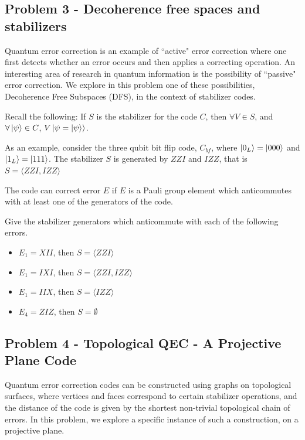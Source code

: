 \newpage
\subsection{Problem 3 - Decoherence free spaces and stabilizers}
Quantum error correction is an example of “active" error correction where one first detects whether an error occurs and then applies a correcting operation. An interesting area of research in quantum information is the possibility of “passive" error correction. We explore in this problem one of these possibilities, Decoherence Free Subspaces (DFS), in the context of stabilizer codes.

Recall the following: If $S$ is the stabilizer for the code $C$, then $\forall V \in S$, and $\forall \ket{\psi} \in C$, $V\ket{\psi = \ket{\psi}}$.

As an example, consider the three qubit bit flip code, $C_{bf}$, where $\ket{0_L} = \ket{000}$ and $\ket{1_L} = \ket{111}$. The stabilizer $S$ is generated by $ZZI$ and $IZZ$, that is $S = \langle ZZI, IZZ \rangle$ 

The code can correct error $E$ if $E$ is a Pauli group element which anticommutes with at least one of the generators of the code.  
 
Give the stabilizer generators which anticommute with each of the following errors.
\begin{itemize}
    \item $E_1 = XII$, then $S = \langle ZZI\rangle$
    \item $E_1 = IXI$, then $S = \langle ZZI, IZZ\rangle$
    \item $E_1 = IIX$, then $S = \langle IZZ\rangle$
    \item $E_4 = ZIZ$, then $S = \emptyset$
\end{itemize}




\newpage
\subsection{Problem 4 - Topological QEC - A Projective Plane Code}
Quantum error correction codes can be constructed using graphs on topological surfaces, where vertices and faces correspond to certain stabilizer operations, and the distance of the code is given by the shortest non-trivial topological chain of errors. In this problem, we explore a specific instance of such a construction, on a projective plane. \\

